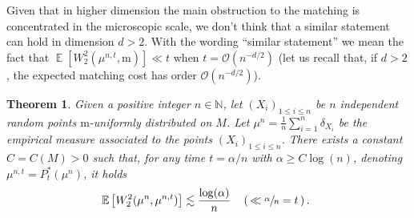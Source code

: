 \documentclass[10pt]{amsart}
\theoremstyle{plain}
\newtheorem{theorem}[theorem]{Theorem}
\theoremstyle{definition}
\numberwithin{equation}{section}
\newcommand{\NN}{\ensuremath{\mathbb N}}
\newcommand{\E}[1]{\ensuremath{\operatorname{\mathbb{E}}\left[#1\right]}}
\newcommand{\bigo}{\ensuremath{\mathcal{O}}}
\newcommand{\fullstop}{\ensuremath{\text{. }}}
\newcommand{\m}{\ensuremath{\mathrm m}}
\begin{document}
Given that in higher dimension the main obstruction to the matching is concentrated in the
microscopic scale, we don't think that a similar statement can hold in dimension $d>2$.
With the wording ``similar statement'' we mean the fact that $\E{W_2^2(\mu^{n,t}, \m)}\ll t$ when
$t=\bigo(n^{-d/2})$ (let us recall that, if $d>2$, the expected matching
cost has order $\bigo(n^{-d/2})$).
\begin{theorem}\label{thm:near_stability_heat_kernel}
Given a positive integer $n\in\NN$, let $(X_i)_{1\le i\le n}$ be $n$ independent random points
$\m$-uniformly distributed on $M$.
Let $\mu^n = \frac1n\sum_{i=1}^n\delta_{X_i}$ be the empirical measure associated to the
points $(X_i)_{1\le i\le n}$. There exists a constant $C=C(M)>0$ such that, for any
time $t=\alpha/n$ with $\alpha\ge C\log(n)$,
denoting $\mu^{n,t}=P_t^*(\mu^n)$, it holds
\begin{equation*}
\E{W_2^2(\mu^n, \mu^{n,t})} \lesssim
\frac{\log(\alpha)}{n} \quad\left(\,\ll \sfrac{\alpha}{n}=t \,\right)\fullstop
\end{equation*}
\end{theorem}
\end{document}
